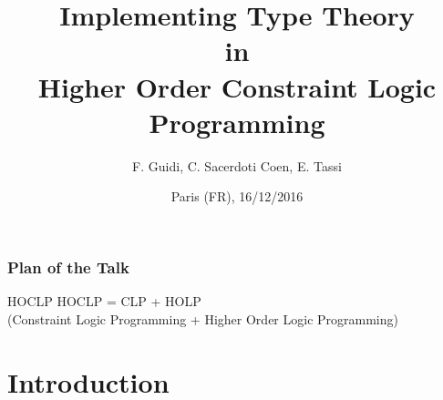 \documentclass{beamer}
\title{Implementing Type Theory\\in\\Higher Order Constraint Logic Programming}
\author[Claudio Sacerdoti Coen]{F. Guidi, \alert{C. Sacerdoti Coen}, E. Tassi}
\institute[University of Bologna, INRIA]
{
  University of Bologna \& INRIA Sophia-Antipolis
}
\date {Paris (FR), 16/12/2016}
\begin{document}
\begin{frame}
  \titlepage
\end{frame}

\begin{frame}[fragile]
 \frametitle{Plan of the Talk}
 \begin{block}{HOCLP}
  HOCLP = CLP + HOLP \\
  {\small (Constraint Logic Programming + Higher Order Logic Programming)}
 \end{block}

 \tableofcontents
\end{frame}

\section{Introduction}


\end{document}
